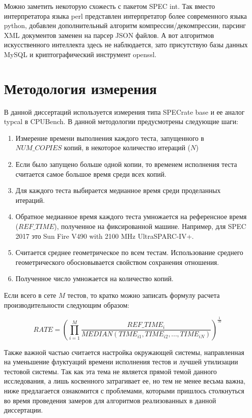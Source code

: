Можно заметить некоторую схожесть с пакетом SPEC int. Так вместо интерпретатора языка perl представлен интерпретатор более современного языка python, добавлен дополнительный алгоритм компрессии/декомпрессии, парсинг XML документов заменен на парсер JSON файлов. А вот алгоритмов искусственного интеллекта здесь не наблюдается, зато присутствую базы данных MySQL и криптографический инструмент openssl.

\section{Методология измерения}
В данной диссертаций используется измерения типа  SPECrate base и ее аналог typcal в CPUBench. В данной методологии предусмотрены следующие шаги:
\begin{enumerate} 
		\item Измерение времени выполнения каждого теста, запущенного в $NUM\_COPIES$ копий, в некоторое количество итераций ($N$)
		\item Если было запущено больше одной копии, то временем исполнения теста считается самое большое время среди всех копий.
		\item Для каждого теста выбирается медианное время среди проделанных итераций. 
		\item Обратное медианное время каждого теста умножается на референсное время ($REF\_TIME$), полученное на фиксированной машине. Например, для SPEC 2017  это  Sun Fire V490 with 2100 MHz UltraSPARC-IV+.
		\item Считается среднее геометрическое по всем тестам. Использование среднего геометрического обосновывается свойством сохранения отношения.
		\item Полученное число умножается на количество копий.
\end{enumerate}
Если всего в сете $M$ тестов, то кратко можно записать формулу расчета производительности следующим образом:

$$RATE =\left(\prod _{i=1}^{M}\dfrac{REF\_TIME_i}{MEDIAN(TIME_{i1}, TIME_{i2}, ... , TIME_{iN})}\right)^{\frac {1}{M}} $$

Также важной частью считается настройка окружающей системы, направленная на уменьшение флуктуаций времени исполнения тестов и лучшей утилизации тестовой системы.
Так как эта тема не является прямой темой данного исследования, а лишь косвенного затрагивает ее, но тем не менее весьма важна, ниже предлагается ознакомится с проблемами, которыми пришлось столкнуться во  время проведения замеров для алгоритмов реализованных в данной диссертации.  

